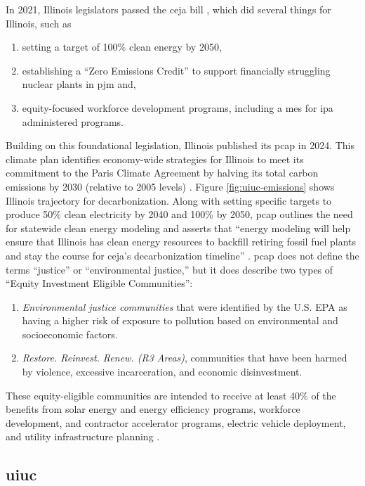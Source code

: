 \noindent
In 2021, Illinois legislators passed the \ac{ceja} bill
\cite{harmon_climate_2021}, which did several things for Illinois, such as
\begin{enumerate}
    \item setting a target of 100\% clean energy by 2050,
    \item establishing a ``Zero Emissions Credit'' to support financially
    struggling nuclear plants in \ac{pjm} and,
    \item equity-focused workforce development programs, including a \acf{mes}
    for \ac{ipa} administered programs.
\end{enumerate}
Building on this foundational legislation, Illinois published its \ac{pcap} in
2024. This climate plan identifies economy-wide strategies for Illinois to meet
its commitment to the Paris Climate Agreement by halving its total carbon
emissions by 2030 (relative to 2005 levels) \cite{kibbey_state_2024}. Figure
\ref{fig:uiuc-emissions} shows Illinois trajectory for decarbonization. Along
with setting specific targets to produce 50\% clean electricity by 2040 and
100\% by 2050, \ac{pcap} outlines the need for statewide clean energy modeling
and asserts that ``energy modeling will help ensure that Illinois has clean
energy resources to backfill retiring fossil fuel plants and stay the course for
\ac{ceja}'s decarbonization timeline'' \cite{kibbey_state_2024}. \ac{pcap} does
not define the terms ``justice'' or ``environmental justice,'' but it does
describe two types of ``Equity Investment Eligible Communities'':
\begin{enumerate}
    \item \textit{Environmental justice communities} that were identified by
    the U.S. EPA as having a higher risk of exposure to pollution based on
    environmental and socioeconomic factors.
    \item \textit{Restore. Reinvest. Renew. (R3 Areas)}, communities that have
    been harmed by violence, excessive incarceration, and economic
    disinvestment.
\end{enumerate}
These equity-eligible communities are intended to receive at least 40\% of
the benefits from solar energy and energy efficiency programs, workforce development,
and contractor accelerator programs, electric vehicle deployment, and utility
infrastructure planning \cite{kibbey_state_2024}.

\subsection{\acf{uiuc}} 

